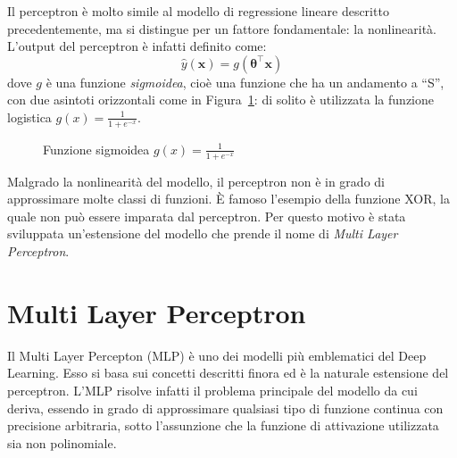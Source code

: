 Il perceptron è molto simile al modello di regressione lineare descritto
precedentemente, ma si distingue per un fattore fondamentale: la nonlinearità.
L'output del perceptron è infatti definito come:
\[\hat{y}(\bm x) = g(\bm \theta^\intercal \bm x)\]
dove $g$ è una funzione \emph{sigmoidea}, cioè una funzione che ha un andamento
a ``S'', con due asintoti orizzontali come in Figura~\ref{fig:sigmoid}: di
solito è utilizzata la funzione logistica $\displaystyle g(x) = \frac{1}{1 + e^{-x}}$.
\begin{figure}[H]
  \caption{Funzione sigmoidea $\displaystyle g(x) = \frac{1}{1 + e^{-x}}$ }%
  \label{fig:sigmoid}
\end{figure}

Malgrado la nonlinearità del modello, il perceptron non è in grado di
approssimare molte classi di funzioni. È famoso l'esempio della funzione XOR,
la quale non può essere imparata dal perceptron. Per questo motivo è stata
sviluppata un'estensione del modello che prende il nome di \emph{Multi Layer
  Perceptron}.
\section{Multi Layer Perceptron}
Il Multi Layer Percepton (MLP) è uno dei modelli più emblematici del Deep
Learning. Esso si basa sui concetti descritti finora ed è la naturale
estensione del perceptron. L'MLP risolve infatti il problema principale del
modello da cui deriva, essendo in grado di approssimare qualsiasi tipo di
funzione continua con precisione arbitraria, sotto l'assunzione che la funzione
di attivazione utilizzata sia non polinomiale\cite{universal-approximator}.

